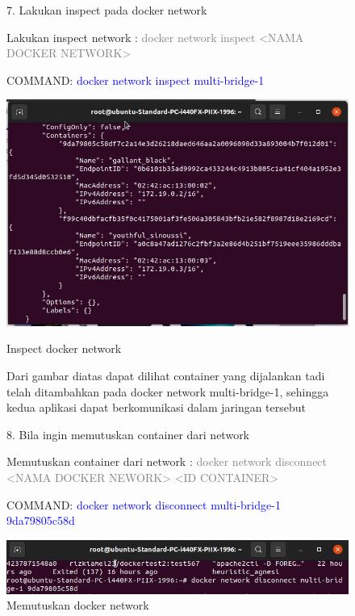 \begin{figure}
    7. Lakukan inspect pada docker network
    
    Lakukan inspect network : \textcolor{Gray}{docker network inspect <NAMA DOCKER NETWORK>}\

    COMMAND: \textcolor{Blue}{docker network inspect multi-bridge-1}
        \begin{center}
            \includegraphics[width=\linewidth]{image/59.jpg}
            \caption{Inspect docker network}
            \label{fig:my_figure}
        \end{center}

    Dari gambar diatas dapat dilihat container yang dijalankan tadi telah ditambahkan pada docker network multi-bridge-1, sehingga kedua aplikasi dapat berkomunikasi dalam jaringan tersebut

    8. Bila ingin memutuskan container dari network 

    Memutuskan container dari network : \textcolor{Gray}{docker network disconnect  <NAMA DOCKER NEWORK> <ID CONTAINER>}

    COMMAND: \textcolor{Blue}{docker network disconnect multi-bridge-1 9da79805c58d}
        \begin{center}
            \includegraphics[width=\linewidth]{image/60.jpg}
            \caption{Memutuskan docker network}
            \label{fig:my_figure}
        \end{center}
\end{figure}

